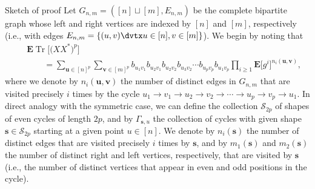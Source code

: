 \documentclass[aop,MSNbibl,dvips]{arximspdf}
\newcommand{\EE}{\mathbf{E}}
\newcommand{\Tr}{\operatorname{Tr}}
\begin{document}
\begin{pf*}{Sketch of proof}
Let $G_{n,m}=([n]\sqcup[m],E_{n,m})$ be the complete bipartite graph
whose left and right vertices are indexed by $[n]$ and $[m]$, respectively
(i.e., with edges $E_{n,m}=\{(u,v)\dvtx u\in[n],v\in[m]\}$). We begin by
noting that
%
\begin{eqnarray*}
&& \EE\Tr\bigl[\bigl(XX^*\bigr)^p\bigr]
\\
&&\qquad = \sum_{\mathbf{u}\in[n]^p} \sum_{\mathbf{v}\in[m]^p}
b_{u_1v_1}b_{u_2v_1}b_{u_2v_2}b_{u_3v_2}\cdots
b_{u_pv_p}b_{u_1v_p} \prod_{i\ge1}\EE
\bigl[g^i\bigr]^{n_i(\mathbf{u},\mathbf{v})},
\end{eqnarray*}
%
where we denote by $n_{i}(\mathbf{u},\mathbf{v})$ the number of distinct
edges in $G_{n,m}$ that are visited precisely $i$ times by the cycle
$u_1\to v_1\to u_2\to v_2\to\cdots\to u_p\to v_p\to u_1$.
In direct analogy with the symmetric case, we can define the collection
$\mathcal{S}_{2p}$ of shapes of even cycles of length $2p$, and by
$\Gamma_{\mathbf{s},u}$ the collection of cycles with given shape
$\mathbf{s}\in\mathcal{S}_{2p}$ starting at a given point $u\in[n]$.
We denote by $n_i(\mathbf{s})$ the number of distinct edges that are
visited precisely $i$ times by $\mathbf{s}$, and by $m_1(\mathbf{s})$ and
$m_2(\mathbf{s})$ the number of distinct right and left vertices,
respectively, that are visited by $\mathbf{s}$ (i.e., the number of
distinct vertices that appear in even and odd positions in the cycle).


\end{pf*}
\end{document}
